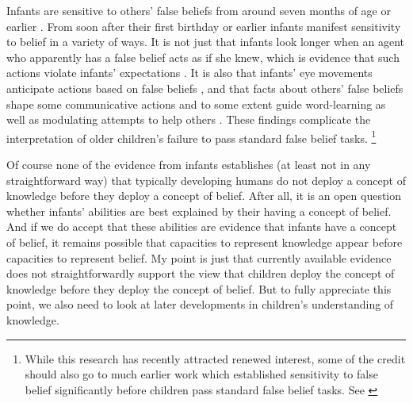 \documentclass[11pt,a4paper]{extarticle}
\begin{document}
Infants are sensitive to others' false beliefs from around seven months of age or earlier \citep{kovacs_social_2010}.
From soon after their first birthday or earlier infants manifest sensitivity to belief in a variety of ways.
It is not just that infants look longer when an agent who apparently has a false belief acts as if she knew, which is evidence that such actions violate infants' expectations  \citep{Onishi:2005hm,Surian:2007hl}.
It is also that infants' eye movements anticipate actions based on false beliefs \citep{Southgate:2007js},
and that facts about others' false beliefs shape some communicative actions \citep{Knudsen:2011fk} and to some extent guide word-learning \citep{Carpenter:2002gc} as well as modulating attempts to help others \citep{Buttelmann:2009gy}.
These findings complicate the interpretation of older children's failure to pass standard false belief tasks.%
\footnote{
While this research has recently attracted renewed interest, some of the credit should also go to much earlier work which established sensitivity to false belief significantly before children pass standard false belief tasks. 
See \citet{Clements:1994cw,Garnham:2001jm,Garnham:2001ql,Ruffman:2001ng}
}



Of course none of the evidence from infants
 establishes (at least not in any straightforward way) that typically developing humans do not deploy a concept of knowledge before they deploy a concept of belief.
After all, it is an open question whether infants' abilities are best explained by their having a concept of belief.
And if we do accept that these abilities are evidence that infants have a concept of belief, 
it remains possible that capacities to represent knowledge appear before capacities to represent belief.
My point is just that currently available evidence does not straightforwardly support the view that children deploy the concept of knowledge before they deploy the concept of belief.
But to fully appreciate this point, we also need to look at later developments in children's understanding of knowledge.
\end{document}
